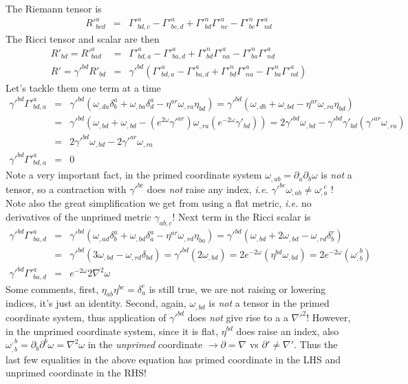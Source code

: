 \documentclass[aps,preprint,preprintnumbers,nofootinbib,showpacs,prd]{revtex4-1}
\newcommand{\ie}{{\it i.e.} }
\newcommand{\nbea}{\begin{eqnarray*}}
\newcommand{\neea}{\end{eqnarray*}}
\begin{document}
The Riemann tensor is
%
\nbea
R'^a_{bcd} & = &  \Gamma'^a_{bd,c} - \Gamma'^a_{bc,d} + \Gamma'^{n}_{bd}\Gamma'^{a}_{nc} - \Gamma'^{n}_{bc}\Gamma'^{a}_{nd}
\neea
%
The Ricci tensor and scalar are then
%
\nbea
R'_{bd} = R'^a_{bad} & = &  \Gamma'^a_{bd,a} - \Gamma'^a_{ba,d} + \Gamma'^{n}_{bd}\Gamma'^{a}_{na} - \Gamma'^{n}_{ba}\Gamma'^{a}_{nd} \\
R' = \gamma'^{bd} R'_{bd} & = & \gamma'^{bd} ( \Gamma'^a_{bd,a} - \Gamma'^a_{ba,d} + \Gamma'^{n}_{bd}\Gamma'^{a}_{na} - \Gamma'^{n}_{ba}\Gamma'^{a}_{nd} )
\neea
%
Let's tackle them one term at a time
%
\nbea
\gamma'^{bd} \Gamma'^a_{bd,a} & = & \gamma'^{bd} \left ( \omega_{,da} \delta^a_b + \omega_{,ba}\delta^a_d - \eta^{ar}\omega_{,ra} \eta_{bd} \right ) = \gamma'^{bd} \left ( \omega_{,db} + \omega_{,bd} - \eta^{ar}\omega_{,ra} \eta_{bd} \right ) \\
& = & \gamma'^{bd} \left ( \omega_{,bd} + \omega_{,bd} - (e^{2\omega}\gamma'^{ar})\omega_{,ra} (e^{-2\omega}\gamma'_{bd}) \right ) =  2 \gamma'^{bd} \omega_{,bd} - \gamma'^{bd} \gamma'_{bd} (\gamma'^{ar} \omega_{,ra}) \\
& = &  2 \gamma'^{bd} \omega_{,bd} - 2 \gamma'^{ar} \omega_{,ra} \\
\gamma'^{bd} \Gamma'^a_{bd,a} & = & 0
\neea
%
Note a very important fact, in the primed coordinate system $\omega_{,ab} = \partial_a\partial_b \omega$ is {\it not} a tensor, so a contraction with $\gamma'^{bc}$ does {\it not} raise any index, \ie $\gamma'^{bc} \omega_{,ab} \neq \omega^{,c}_{,a}$ ! Note also the great simplification we get from using a flat metric, \ie no derivatives of the unprimed metric $\gamma_{ab,c}$! Next term in the Ricci scalar is
%
\nbea
\gamma'^{bd} \Gamma'^a_{ba,d} & = & \gamma'^{bd} \left ( \omega_{,ad} \delta^a_b + \omega_{,bd}\delta^a_a - \eta^{ar}\omega_{,rd} \eta_{ba} \right ) = \gamma'^{bd} \left ( \omega_{,bd} + 2 \omega_{,bd} - \omega_{,rd} \delta^r_{b} \right ) \\
& = & \gamma'^{bd} \left ( 3 \omega_{,bd} - \omega_{,rd} \delta_{bd} \right ) = \gamma'^{bd} \left ( 2 \omega_{,bd} \right ) = 2 e^{-2 \omega} (\eta^{bd} \omega_{,bd}) = 2 e^{-2 \omega} (\omega^{,b}_{,b})\\
\gamma'^{bd} \Gamma'^a_{ba,d} & = &  e^{-2 \omega} 2 \nabla^2 \omega
\neea
%
Some comments, first, $\eta_{ab}\eta^{bc} = \delta^c_a$ is still true, we are not raising or lowering indices, it's just an identity. Second, again, $\omega_{,bd}$ is {\it not} a tensor in the primed coordinate system, thus application of $\gamma'^{bd}$ does {\it not} give rise to a a $\nabla'^2$! However, in the unprimed coordinate system, since it is flat, $\eta^{bd}$ does raise an index, also $\omega^{,b}_{,b} = \partial_b\partial^b \omega = \nabla^2 \omega$ in the {\it unprimed} coordinate $\rightarrow \partial = \nabla$ vs $\partial' \neq \nabla'$. Thus the last few equalities in the above equation has primed coordinate in the LHS and unprimed coordinate in the RHS!
\end{document}
